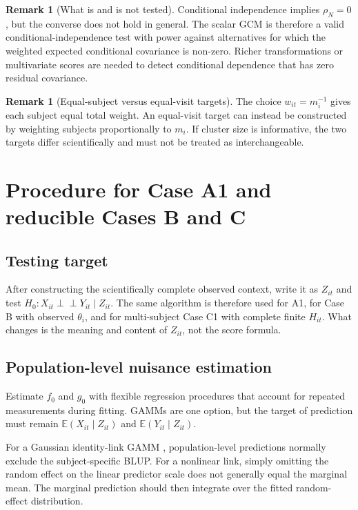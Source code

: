 \documentclass[11pt]{article}
\theoremstyle{definition}
\newtheorem{remark}[theorem]{Remark}
\newcommand{\indep}{\perp\!\!\!\perp}
\newcommand{\E}{\mathbb{E}}
\begin{document}
\begin{remark}[What is and is not tested]
Conditional independence implies $\rho_N=0$, but the converse does not hold in general.
The scalar GCM is therefore a valid conditional-independence test with power against
alternatives for which the weighted expected conditional covariance is non-zero. Richer
transformations or multivariate scores are needed to detect conditional dependence that
has zero residual covariance.
\end{remark}

\begin{remark}[Equal-subject versus equal-visit targets]
The choice $w_{it}=m_i^{-1}$ gives each subject equal total weight. An equal-visit target
can instead be constructed by weighting subjects proportionally to $m_i$. If cluster size is
informative, the two targets differ scientifically and must not be treated as interchangeable.
\end{remark}

\section{Procedure for Case A1 and reducible Cases B and C}

\subsection{Testing target}

After constructing the scientifically complete observed context, write it as $Z_{it}$ and
test
\texorpdfstring{$H_0:X_{it}\indep Y_{it}\mid Z_{it}$}
{H0: X independent of Y given Z}.
The same algorithm is therefore used for A1, for Case B with observed $\theta_i$, and for
multi-subject Case C1 with complete finite $H_{it}$. What changes is the meaning and content of
$Z_{it}$, not the score formula.

\subsection{Population-level nuisance estimation}

Estimate $f_0$ and $g_0$ with flexible regression procedures that account for repeated
measurements during fitting. GAMMs are one option, but the target of prediction must remain
$\E(X_{it}\mid Z_{it})$ and $\E(Y_{it}\mid Z_{it})$.

For a Gaussian identity-link GAMM \cite{wood2017}, population-level predictions normally exclude the
subject-specific BLUP. For a nonlinear link, simply omitting the random effect on the linear
predictor scale does not generally equal the marginal mean. The marginal prediction should
then integrate over the fitted random-effect distribution.
\end{document}
